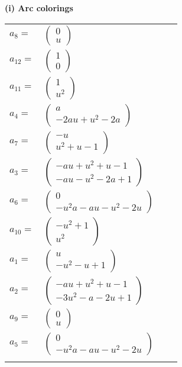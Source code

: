 \documentclass[1p]{elsarticle_modified}
\theoremstyle{definition}
\begin{document}
\flushleft \textbf{(i) Arc colorings}\\
\begin{tabular}{m{7pt} m{180pt} m{7pt} m{180pt} }
\flushright $a_{8}=$&$\begin{pmatrix}0\\u\end{pmatrix}$ \\
\flushright $a_{12}=$&$\begin{pmatrix}1\\0\end{pmatrix}$ \\
\flushright $a_{11}=$&$\begin{pmatrix}1\\u^2\end{pmatrix}$ \\
\flushright $a_{4}=$&$\begin{pmatrix}a\\-2 a u+u^2-2 a\end{pmatrix}$ \\
\flushright $a_{7}=$&$\begin{pmatrix}- u\\u^2+u-1\end{pmatrix}$ \\
\flushright $a_{3}=$&$\begin{pmatrix}- a u+u^2+u-1\\- a u- u^2-2 a+1\end{pmatrix}$ \\
\flushright $a_{6}=$&$\begin{pmatrix}0\\- u^2 a- a u- u^2-2 u\end{pmatrix}$ \\
\flushright $a_{10}=$&$\begin{pmatrix}- u^2+1\\u^2\end{pmatrix}$ \\
\flushright $a_{1}=$&$\begin{pmatrix}u\\- u^2- u+1\end{pmatrix}$ \\
\flushright $a_{2}=$&$\begin{pmatrix}- a u+u^2+u-1\\-3 u^2- a-2 u+1\end{pmatrix}$ \\
\flushright $a_{9}=$&$\begin{pmatrix}0\\u\end{pmatrix}$ \\
\flushright $a_{5}=$&$\begin{pmatrix}0\\- u^2 a- a u- u^2-2 u\end{pmatrix}$\\&\end{tabular}
\end{document}

